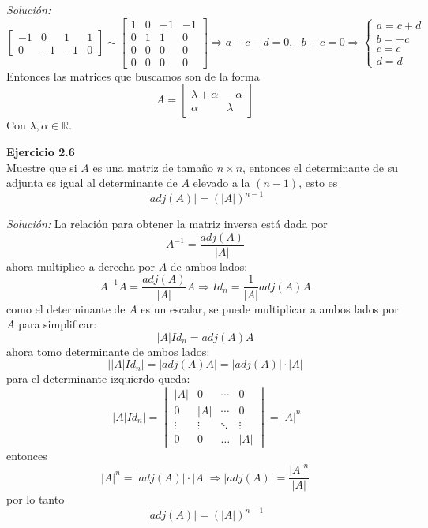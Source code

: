 \documentclass{article}
\newenvironment{problem}[2][Ejercicio]
    { \begin{mdframed}[backgroundcolor=gray!20] \textbf{#1 #2} \\}
    {  \end{mdframed}}
\newenvironment{solution}
    {\textit{Solución:}}
    {}
\begin{document}
\begin{solution}
\[\begin{bmatrix}
-1 & 0 & 1 & 1 \\
0 & -1 & -1 & 0
\end{bmatrix} \sim
\begin{bmatrix}
1 & 0 & -1 & -1 \\
0 & 1 & 1 & 0 \\
0 & 0 & 0 & 0 \\
0 & 0 & 0 & 0
\end{bmatrix} \Rightarrow a -c-d = 0, \ \ \ b+c = 0 \Rightarrow
\begin{cases}
a = c+d \\
b = -c \\
c = c \\
d = d
\end{cases}
\]
Entonces las matrices que buscamos son de la forma
\[
A = \begin{bmatrix}
\lambda + \alpha & -\alpha \\
\alpha & \lambda
\end{bmatrix}
\]
Con $\lambda, \alpha \in \mathbb{R}$.
\end{solution}

\begin{problem}{2.6}
    Muestre que si $A$ es una matriz de tamaño $n\times n$, entonces el determinante de su adjunta es igual al determinante de $A$ elevado a la $(n - 1)$, esto es
\[
|adj(A)| = (|A|)^{n-1}
\]
\end{problem}
\begin{solution}
    La relación para obtener la matriz inversa está dada por
\[
A^{-1} = \frac{adj(A)}{|A|}
\]
ahora multiplico a derecha por $A$ de ambos lados:
\[
A^{-1} A = \frac{adj(A)}{|A|} A \Rightarrow Id_n = \frac{1}{|A|}adj(A)A
\]
como el determinante de $A$ es un escalar, se puede multiplicar a ambos lados por $A$ para simplificar:
\[
|A| Id_n = adj(A)A
\]
ahora tomo determinante de ambos lados:
\[
||A| Id_n | = |adj(A)A| = |adj(A)| \cdot |A|
\]
para el determinante izquierdo queda:
\[
 ||A| Id_n | = 
\begin{vmatrix}
|A| & 0 & \cdots & 0 \\
0 & |A| & \cdots & 0 \\
\vdots & \vdots & \ddots & \vdots \\
0 & 0 & \dots & |A|
\end{vmatrix} = |A|^n
\]
entonces
\[
|A|^n = |adj(A)| \cdot |A| \Rightarrow |adj(A)| = \frac{|A|^n}{|A|} 
\]
por lo tanto
\[
|adj(A)| = (|A|)^{n-1}
\]
\end{solution}
\end{document}
